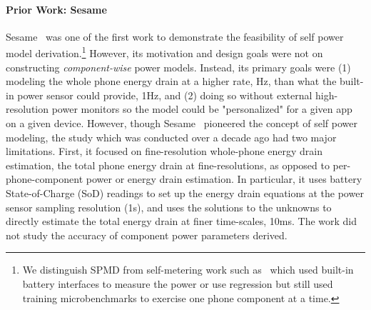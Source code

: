\paragraph{Prior Work: Sesame}
\label{sec:back}
%
Sesame~\cite{dong2011self} was one of the first work to demonstrate 
the feasibility of self power model derivation.\footnote{We distinguish SPMD from self-metering work such as~\cite{zhang2010accurate,devscope:2012} 
which used built-in battery interfaces to measure the power or 
use regression but still used training microbenchmarks to 
exercise one phone component at a time.
}
However, its motivation and design goals were not on constructing 
{\it component-wise} power models. Instead, its primary goals were (1) modeling the whole phone energy drain at a higher rate,  Hz,
than what the built-in power sensor could provide, \eg 1Hz, and (2) doing so without external high-resolution power monitors so the model could be "personalized" for a given app on a given device.  
%
However, though Sesame~\cite{dong2011self} pioneered the concept 
of self power modeling, the study which was conducted over a decade 
ago had two major limitations.
First, it focused on fine-resolution whole-phone energy drain 
estimation, \eg the total phone energy drain at fine-resolutions, 
as opposed to per-phone-component power or energy drain estimation.
\fi 
In particular, it uses battery State-of-Charge (SoD) readings to 
set up the energy drain equations at the power sensor sampling 
resolution (\eg 1s), and uses the solutions to the unknowns to 
directly estimate the total energy drain at finer time-scales, \eg 10ms.
The work did not study the accuracy of component power parameters derived.

